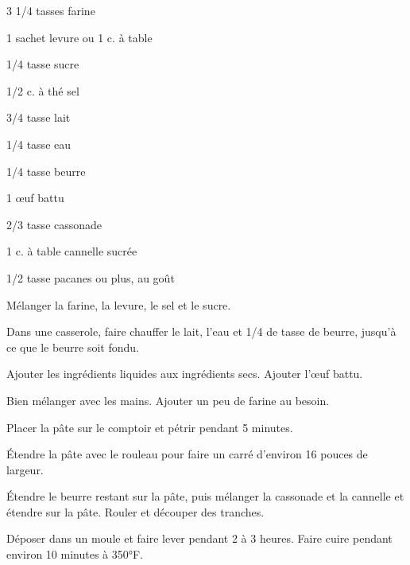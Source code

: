



\totaltime{}


\begin{ingredients}
    \item 3 1/4 tasses farine
    \item 1 sachet levure ou 1 c. à table
    \item 1/4 tasse sucre
    \item 1/2 c. à thé sel
    \item 3/4 tasse lait
    \item 1/4 tasse eau
    \item 1/4 tasse beurre
    \item 1 œuf battu
    \item 2/3 tasse cassonade
    \item 1 c. à table cannelle sucrée
    \item 1/2 tasse pacanes ou plus, au goût
\end{ingredients}

\begin{steps}
    \item Mélanger la farine, la levure, le sel et le sucre.
    \item Dans une casserole, faire chauffer le lait, l'eau et 1/4 de tasse de beurre, jusqu'à ce que le beurre soit fondu.
    \item Ajouter les ingrédients liquides aux ingrédients secs. Ajouter l'œuf battu.
    \item Bien mélanger avec les mains. Ajouter un peu de farine au besoin.
    \item Placer la pâte sur le comptoir et pétrir pendant 5 minutes.
    \item Étendre la pâte avec le rouleau pour faire un carré d'environ 16 pouces de largeur.
    \item Étendre le beurre restant sur la pâte, puis mélanger la cassonade et la cannelle et étendre sur la pâte. Rouler et découper des tranches.
    \item Déposer dans un moule et faire lever pendant 2 à 3 heures. Faire cuire pendant environ 10 minutes à 350°F.
\end{steps}

